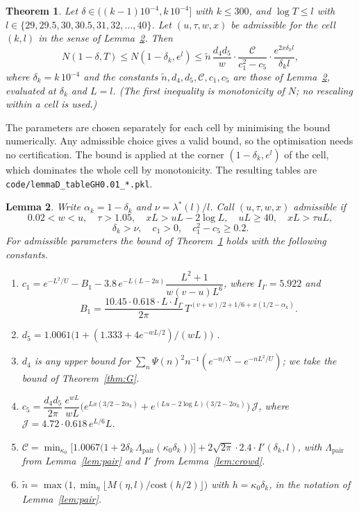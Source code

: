 \documentclass[11pt]{amsart}
\numberwithin{equation}{section}
\newtheorem{theorem}{Theorem}[section]
\newtheorem{lemma}[theorem]{Lemma}
\theoremstyle{definition}
\theoremstyle{remark}
\newcommand{\code}[1]{\texttt{#1}}
\begin{document}
\begin{theorem}\label{thm:density}
Let $\delta \in ((k-1)10^{-4}, k\,10^{-4}]$ with $k \le 300$, and $\log T \le l$ with $l \in \{29, 29.5, 30, 30.5, 31, 32, \dots, 40\}$.
Let $(u,\tau,w,x)$ be admissible for the cell $(k,l)$ in the sense of Lemma~\ref{lem:D}.
Then
\[
N(1-\delta, T) \le N(1-\delta_k, e^l) \le \tilde n\,\frac{d_4d_5}{w}\cdot\frac{\mathcal C}{c_1^2 - c_5}\cdot\frac{e^{2x\delta_kl}}{\delta_kl},
\]
where $\delta_k = k\,10^{-4}$ and the constants $\tilde n, d_4, d_5, \mathcal C, c_1, c_5$ are those of Lemma~\ref{lem:D}, evaluated at $\delta_k$ and $L = l$.
(The first inequality is monotonicity of $N$; no rescaling within a cell is used.)
\end{theorem}

The parameters are chosen separately for each cell by minimising the bound numerically.
Any admissible choice gives a valid bound, so the optimisation needs no certification.
The bound is applied at the corner $(1-\delta_k, e^l)$ of the cell, which dominates the whole cell by monotonicity.
The resulting tables are \code{code/lemmaD\_tableGH0.01\_*.pkl}.

\begin{lemma}\label{lem:D}
Write $\alpha_k = 1 - \delta_k$ and $\nu = \lambda^*(l)/l$.
Call $(u,\tau,w,x)$ admissible if
\[
0.02 < w < u,\quad \tau > 1.05,\quad xL > uL - 2\log L,\quad uL \ge 40,\quad xL > \tau uL,
\]
\[
\delta_k > \nu,\quad c_1 > 0,\quad c_1^2 - c_5 \ge 0.2 .
\]
For admissible parameters the bound of Theorem~\ref{thm:density} holds with the following constants.
\begin{enumerate}
\item[(i)] $c_1 = e^{-L^2/U} - B_1 - 3.8\,e^{-L(L-2u)}\dfrac{L^2+1}{w(v-u)L^6}$, where $I_\Gamma = 5.922$ and
\[
B_1 = \frac{10.45\cdot 0.618\cdot L\cdot I_\Gamma}{2\pi}\,T^{(v+w)/2 + 1/6 + x(1/2-\alpha_k)} .
\]
\item[(ii)] $d_5 = 1.0061\big(1 + (1.333 + 4e^{-wL/2})/(wL)\big)$ \cite[Lemma~4.3]{Bellotti}.
\item[(iii)] $d_4$ is any upper bound for $\sum_n \Psi(n)^2n^{-1}(e^{-n/X} - e^{-nL^2/U})$; we take the bound of Theorem~\ref{thm:G}.
\item[(iv)] $c_5 = \dfrac{d_4d_5}{2\pi}\,\dfrac{e^{wL}}{wL}\Big(e^{Lx(3/2-2\alpha_k)} + e^{(Lu-2\log L)(3/2-2\alpha_k)}\Big)\,\mathcal J$, where $\mathcal J = 4.72\cdot 0.618\, e^{L/6}L$.
\item[(v)] $\mathcal C = \min_{\kappa_0}\Big[1.0067\big(1 + 2\delta_k\,\Lambda_{\mathrm{pair}}(\kappa_0\delta_k)\big)\Big] + 2\sqrt{2\pi}\cdot 2.4\cdot I'(\delta_k,l)$, with $\Lambda_{\mathrm{pair}}$ from Lemma~\ref{lem:pair} and $I'$ from Lemma~\ref{lem:crowd}.
\item[(vi)] $\tilde n = \max\big(1, \min_\eta\lfloor M(\eta,l)/\mathrm{cost}(h/2)\rfloor\big)$ with $h = \kappa_0\delta_k$, in the notation of Lemma~\ref{lem:pair}.
\end{enumerate}
\end{lemma}
\end{document}
